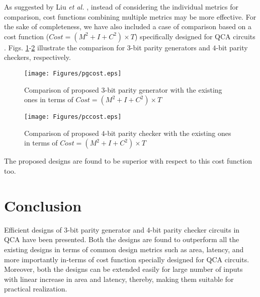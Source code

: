 \documentclass[conference]{IEEEtran}
\begin{document}
As suggested by Liu {\it et al.} \cite{Liu_tnano2014}, instead of considering the individual metrics for comparison, cost functions combining multiple metrics may be more effective.
For the sake of completeness, we have also included a case of comparison based on a cost function ($Cost = (M^2 + I + C^2) \times T$) specifically designed for QCA circuits \cite{Liu_tnano2014}.
Figs. \ref{fig:costppg}-\ref{fig:costppc} illustrate the comparison for $3$-bit parity generators and $4$-bit parity checkers, respectively.
\begin{figure}[ht!]
\texttt{[image: Figures/pgcost.eps]}
\caption{\small Comparison of proposed $3$-bit parity generator with the existing ones in terms of $Cost=(M^2+I+C^2) \times T$}
\label{fig:costppg}
\vspace{0.3cm}
\end{figure}
\begin{figure}[ht!]
\texttt{[image: Figures/pccost.eps]}
\caption{\small Comparison of proposed $4$-bit parity checker with the existing ones in terms of $Cost=(M^2+I+C^2) \times T$}
\label{fig:costppc}
\vspace{0.3cm}
\end{figure}
The proposed designs are found to be superior with respect to this cost function too.
\section{Conclusion}
\label{sec:Conclusion}
Efficient designs of $3$-bit parity generator and $4$-bit parity checker circuits in QCA have been presented. Both the designs are found to outperform all the existing designs in terms of common design metrics such as area, latency, and more importantly in-terms of cost function specially designed for QCA circuits. Moreover, both the designs can be extended easily for large number of inputs with linear increase in area and latency, thereby, making them suitable for practical realization.

%
%
%
%
%
\end{document}
